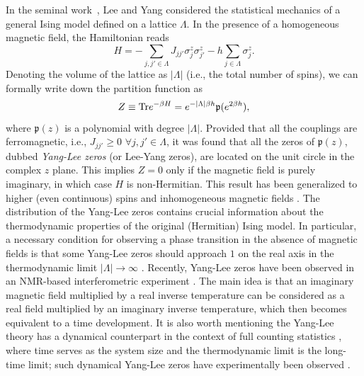 \documentclass{tADP2e}
\theoremstyle{plain}
\theoremstyle{plain}
\theoremstyle{definition}
\begin{document}
\vspace{3pt}
\noindent
In the seminal work~\cite{LTD52}, Lee and Yang considered the statistical mechanics of a general Ising model defined on a lattice $\Lambda$. In the presence of a homogeneous magnetic field, the Hamiltonian reads 
\begin{equation}
H=-\sum_{j,j'\in\Lambda}J_{jj'}\sigma^z_j\sigma^z_{j'}-h\sum_{j\in\Lambda}\sigma^z_j.
\end{equation}
Denoting the volume of the lattice as $|\Lambda|$ (i.e., the total number of spins), we can formally write down the partition function as
\begin{equation}
Z\equiv{\rm Tr}e^{-\beta H}=e^{-|\Lambda|\beta h}\mathfrak{p}(e^{2\beta h}),
\end{equation}
where $\mathfrak{p}(z)$ is a polynomial with degree $|\Lambda|$. Provided that all the couplings are ferromagnetic, i.e., $J_{jj'}\ge0$ $\forall j,j'\in\Lambda$, it was found that all the zeros of $\mathfrak{p}(z)$, dubbed \emph{Yang-Lee zeros} (or Lee-Yang zeros), are located on the unit circle in the complex $z$ plane. This implies $Z=0$ only if the magnetic field is {purely imaginary}, in which case $H$ is non-Hermitian. This result has been generalized to higher (even continuous) spins and inhomogeneous magnetic fields \cite{NCM74,LEH81}. The distribution of the Yang-Lee zeros contains crucial information about the thermodynamic properties of the original (Hermitian) Ising model. In particular, a necessary condition for observing a phase transition in the absence of magnetic fields is that some Yang-Lee zeros should approach $1$ on the real axis in the thermodynamic limit $|\Lambda|\to\infty$ \cite{LTD52}. Recently, Yang-Lee zeros have been observed in an NMR-based interferometric experiment \cite{WBB12,PX15}. The main idea is that an imaginary magnetic field multiplied by a real inverse temperature can be considered as a real field multiplied by an imaginary inverse temperature, which then becomes equivalent to a time development. It is also worth mentioning the Yang-Lee theory  has a dynamical counterpart in the context of full counting statistics \cite{FC13}, where time serves as the system size and the thermodynamic limit is the long-time limit; such dynamical Yang-Lee zeros have experimentally been observed \cite{BK17}. 
\end{document}
